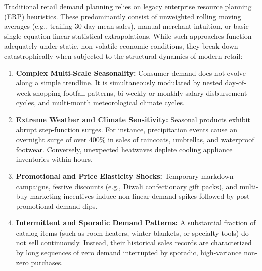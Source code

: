 \documentclass[12pt,a4paper,oneside]{report}
\theoremstyle{definition}
\begin{document}
Traditional retail demand planning relies on legacy enterprise resource planning (ERP) heuristics. These predominantly consist of unweighted rolling moving averages (e.g., trailing 30-day mean sales), manual merchant intuition, or basic single-equation linear statistical extrapolations. While such approaches function adequately under static, non-volatile economic conditions, they break down catastrophically when subjected to the structural dynamics of modern retail:
\begin{enumerate}[itemsep=0.2cm]
    \item \textbf{Complex Multi-Scale Seasonality:} Consumer demand does not evolve along a simple trendline. It is simultaneously modulated by nested day-of-week shopping footfall patterns, bi-weekly or monthly salary disbursement cycles, and multi-month meteorological climate cycles.
    \item \textbf{Extreme Weather and Climate Sensitivity:} Seasonal products exhibit abrupt step-function surges. For instance, precipitation events cause an overnight surge of over 400\% in sales of raincoats, umbrellas, and waterproof footwear. Conversely, unexpected heatwaves deplete cooling appliance inventories within hours.
    \item \textbf{Promotional and Price Elasticity Shocks:} Temporary markdown campaigns, festive discounts (e.g., Diwali confectionary gift packs), and multi-buy marketing incentives induce non-linear demand spikes followed by post-promotional demand dips.
    \item \textbf{Intermittent and Sporadic Demand Patterns:} A substantial fraction of catalog items (such as room heaters, winter blankets, or specialty tools) do not sell continuously. Instead, their historical sales records are characterized by long sequences of zero demand interrupted by sporadic, high-variance non-zero purchases.
\end{enumerate}
\end{document}
